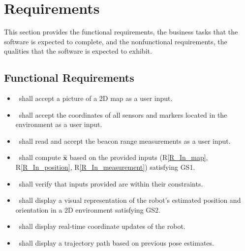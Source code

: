 \documentclass[12pt]{article}
\newcounter{reqnum} %
\newcommand{\rref}[1]{R\ref{#1}}
\begin{document}
\section{Requirements}

This section provides the functional requirements, the business tasks that the
software is expected to complete, and the nonfunctional requirements, the
qualities that the software is expected to exhibit.

\subsection{Functional Requirements}

\noindent\begin{itemize}

\item[R\refstepcounter{reqnum}\thereqnum\label{R_In_map}:] \progname~shall accept a picture of a 2D map as a user input.

\item[R\refstepcounter{reqnum}\thereqnum\label{R_In_position}:] \progname~shall accept the coordinates of all sensors and markers located in the environment as a user input.

\item[R\refstepcounter{reqnum}\thereqnum\label{R_In_measurement}:] \progname~shall read and accept the beacon range measurements as a user input.

\item[R\refstepcounter{reqnum}\thereqnum\label{R_Calculate}:] \progname~shall compute $\mathbf{\hat{x}}$ based on the provided inputs (\rref{R_In_map}, \rref{R_In_position}, \rref{R_In_measurement}) satisfying GS1.

\item[R\refstepcounter{reqnum}\thereqnum\label{R_VerifyOutput}:] \progname~shall verify that inputs provided are within their constraints.

\item[R\refstepcounter{reqnum}\thereqnum\label{R_Out_Visual}:] \progname~shall display a visual representation of the robot’s estimated position and orientation in a 2D environment satisfying GS2.

\item[R\refstepcounter{reqnum}\thereqnum\label{R_Out_Coordinates}:] \progname~shall display real-time coordinate updates of the robot.

\item[R\refstepcounter{reqnum}\thereqnum\label{R_Out_Trajectory}:] \progname~shall display a trajectory path based on previous pose estimates.

\end{itemize}
\end{document}
